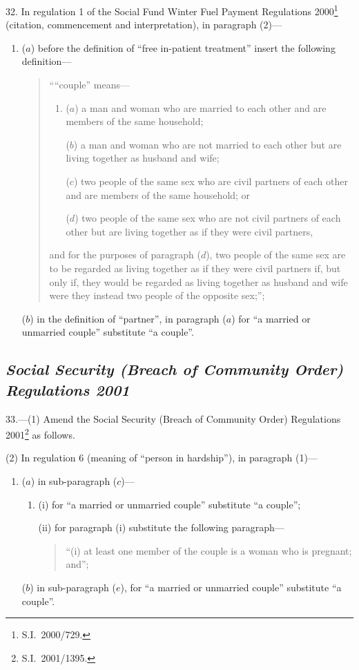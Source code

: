 \documentclass[12pt,a4paper]{article}
\begin{document}
32.  In regulation 1 of the Social Fund Winter Fuel Payment Regulations 2000\footnote{S.I.\ 2000/729.} (citation, commencement and interpretation), in paragraph (2)—
\begin{enumerate}\item[]
($a$) before the definition of “free in-patient treatment” insert the following definition—
\begin{quotation}
““couple” means—
\begin{enumerate}\item[]
($a$) 
a man and woman who are married to each other and are members of the same household;

($b$) 
a man and woman who are not married to each other but are living together as husband and wife;

($c$) 
two people of the same sex who are civil partners of each other and are members of the same household; or

($d$) 
two people of the same sex who are not civil partners of each other but are living together as if they were civil partners,
\end{enumerate}
and for the purposes of paragraph ($d$), two people of the same sex are to be regarded as living together as if they were civil partners if, but only if, they would be regarded as living together as husband and wife were they instead two people of the opposite sex;”;
\end{quotation}

($b$) in the definition of “partner”, in paragraph ($a$)  for “a married or unmarried couple” substitute “a couple”.
\end{enumerate}

\subsection*{\itshape Social Security (Breach of Community Order) Regulations 2001}

33.---(1)  Amend the Social Security (Breach of Community Order) Regulations 2001\footnote{S.I.\ 2001/1395.} as follows.

(2) In regulation 6 (meaning of “person in hardship”), in paragraph (1)—
\begin{enumerate}\item[]
($a$) in sub-paragraph ($c$)—
\begin{enumerate}\item[]
(i) for “a married or unmarried couple” substitute “a couple”;

(ii) for paragraph (i)  substitute the following paragraph—
\begin{quotation}
“(i) at least one member of the couple is a woman who is pregnant; and”;
\end{quotation}
\end{enumerate}

($b$) in sub-paragraph ($e$), for “a married or unmarried couple” substitute “a couple”.
\end{enumerate}
\end{document}
